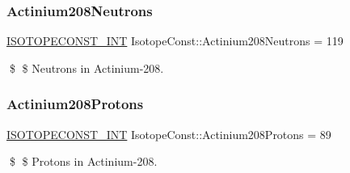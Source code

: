 \subsubsection{\texorpdfstring{Actinium208\+Neutrons}{Actinium208Neutrons}}
{\footnotesize\ttfamily \mbox{\hyperlink{group___isotope_const-_macros_ga5f18360b3e99483a35c32d789e62621c}{I\+S\+O\+T\+O\+P\+E\+C\+O\+N\+S\+T\+\_\+\+I\+NT}} Isotope\+Const\+::\+Actinium208\+Neutrons = 119}

\$ \$ Neutrons in Actinium-\/208. \mbox{\label{group___isotope_const-_actinium-_ac208_ga93070fef125ff2de65076f0c1f61aca2}} 
\subsubsection{\texorpdfstring{Actinium208\+Protons}{Actinium208Protons}}
{\footnotesize\ttfamily \mbox{\hyperlink{group___isotope_const-_macros_ga5f18360b3e99483a35c32d789e62621c}{I\+S\+O\+T\+O\+P\+E\+C\+O\+N\+S\+T\+\_\+\+I\+NT}} Isotope\+Const\+::\+Actinium208\+Protons = 89}

\$ \$ Protons in Actinium-\/208. 